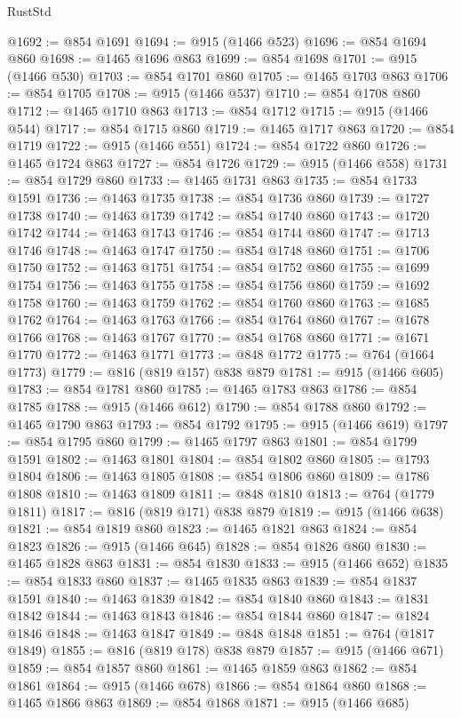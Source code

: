 \begin{lexlean}{RustStd}
\begin{coremodule}
@1692 := @854 @1691
@1694 := @915 (@1466 @523)
@1696 := @854 @1694 @860
@1698 := @1465 @1696 @863
@1699 := @854 @1698
@1701 := @915 (@1466 @530)
@1703 := @854 @1701 @860
@1705 := @1465 @1703 @863
@1706 := @854 @1705
@1708 := @915 (@1466 @537)
@1710 := @854 @1708 @860
@1712 := @1465 @1710 @863
@1713 := @854 @1712
@1715 := @915 (@1466 @544)
@1717 := @854 @1715 @860
@1719 := @1465 @1717 @863
@1720 := @854 @1719
@1722 := @915 (@1466 @551)
@1724 := @854 @1722 @860
@1726 := @1465 @1724 @863
@1727 := @854 @1726
@1729 := @915 (@1466 @558)
@1731 := @854 @1729 @860
@1733 := @1465 @1731 @863
@1735 := @854 @1733 @1591
@1736 := @1463 @1735
@1738 := @854 @1736 @860
@1739 := @1727 @1738
@1740 := @1463 @1739
@1742 := @854 @1740 @860
@1743 := @1720 @1742
@1744 := @1463 @1743
@1746 := @854 @1744 @860
@1747 := @1713 @1746
@1748 := @1463 @1747
@1750 := @854 @1748 @860
@1751 := @1706 @1750
@1752 := @1463 @1751
@1754 := @854 @1752 @860
@1755 := @1699 @1754
@1756 := @1463 @1755
@1758 := @854 @1756 @860
@1759 := @1692 @1758
@1760 := @1463 @1759
@1762 := @854 @1760 @860
@1763 := @1685 @1762
@1764 := @1463 @1763
@1766 := @854 @1764 @860
@1767 := @1678 @1766
@1768 := @1463 @1767
@1770 := @854 @1768 @860
@1771 := @1671 @1770
@1772 := @1463 @1771
@1773 := @848 @1772
@1775 := @764 (@1664 @1773)
@1779 := @816 (@819 @157) @838 @879
@1781 := @915 (@1466 @605)
@1783 := @854 @1781 @860
@1785 := @1465 @1783 @863
@1786 := @854 @1785
@1788 := @915 (@1466 @612)
@1790 := @854 @1788 @860
@1792 := @1465 @1790 @863
@1793 := @854 @1792
@1795 := @915 (@1466 @619)
@1797 := @854 @1795 @860
@1799 := @1465 @1797 @863
@1801 := @854 @1799 @1591
@1802 := @1463 @1801
@1804 := @854 @1802 @860
@1805 := @1793 @1804
@1806 := @1463 @1805
@1808 := @854 @1806 @860
@1809 := @1786 @1808
@1810 := @1463 @1809
@1811 := @848 @1810
@1813 := @764 (@1779 @1811)
@1817 := @816 (@819 @171) @838 @879
@1819 := @915 (@1466 @638)
@1821 := @854 @1819 @860
@1823 := @1465 @1821 @863
@1824 := @854 @1823
@1826 := @915 (@1466 @645)
@1828 := @854 @1826 @860
@1830 := @1465 @1828 @863
@1831 := @854 @1830
@1833 := @915 (@1466 @652)
@1835 := @854 @1833 @860
@1837 := @1465 @1835 @863
@1839 := @854 @1837 @1591
@1840 := @1463 @1839
@1842 := @854 @1840 @860
@1843 := @1831 @1842
@1844 := @1463 @1843
@1846 := @854 @1844 @860
@1847 := @1824 @1846
@1848 := @1463 @1847
@1849 := @848 @1848
@1851 := @764 (@1817 @1849)
@1855 := @816 (@819 @178) @838 @879
@1857 := @915 (@1466 @671)
@1859 := @854 @1857 @860
@1861 := @1465 @1859 @863
@1862 := @854 @1861
@1864 := @915 (@1466 @678)
@1866 := @854 @1864 @860
@1868 := @1465 @1866 @863
@1869 := @854 @1868
@1871 := @915 (@1466 @685)

\end{coremodule}
\end{lexlean}
